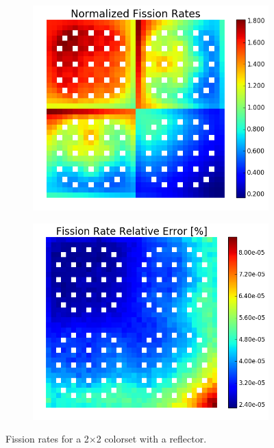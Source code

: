 \begin{figure}[h!]
\centering
\begin{subfigure}{0.44\textwidth}
  \centering
  \includegraphics[width=\linewidth]{figures/benchmarks/fission-rates/fiss-mean-reflector}
  \caption{}
  \label{fig:chap7-fiss-rate-conv}
\end{subfigure}%
\begin{subfigure}{0.44\textwidth}
  \centering
  \includegraphics[width=\linewidth]{figures/benchmarks/fission-rates/fiss-rel-err-reflector}
  \caption{}
  \label{fig:chap7-fiss-rate-conv}
\end{subfigure}%
\caption[Fission rates for a 2$\times$2 colorset with a reflector]{Fission rates for a 2$\times$2 colorset with a reflector.}
\label{fig:chap7-fiss-rates-2x2}
\end{figure}

